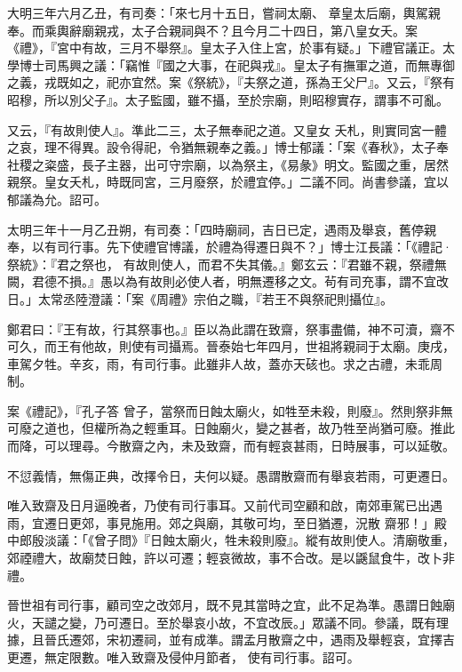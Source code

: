 \begin{pinyinscope}
 大明三年六月乙丑，有司奏：「來七月十五日，嘗祠太廟、
 章皇太后廟，輿駕親奉。而乘輿辭廟親戎，太子合親祠與不？且今月二十四日，第八皇女夭。案《禮》，『宮中有故，三月不舉祭』。皇太子入住上宮，於事有疑。」下禮官議正。太學博士司馬興之議：「竊惟『國之大事，在祀與戎』。皇太子有撫軍之道，而無專御之義，戎既如之，祀亦宜然。案《祭統》，『夫祭之道，孫為王父尸』。又云，『祭有昭穆，所以別父子』。太子監國，雖不攝，至於宗廟，則昭穆實存，謂事不可亂。



 又云，『有故則使人』。準此二三，太子無奉祀之道。又皇女
 夭札，則實同宮一體之哀，理不得異。設令得祀，令猶無親奉之義。」博士郁議：「案《春秋》，太子奉社稷之粢盛，長子主器，出可守宗廟，以為祭主，《易彖》明文。監國之重，居然親祭。皇女夭札，時既同宮，三月廢祭，於禮宜停。」二議不同。尚書參議，宜以郁議為允。詔可。



 太明三年十一月乙丑朔，有司奏：「四時廟祠，吉日已定，遇雨及舉哀，舊停親奉，以有司行事。先下使禮官博議，於禮為得遷日與不？」博士江長議：「《禮記·祭統》：『君之祭也，
 有故則使人，而君不失其儀。』鄭玄云：『君雖不親，祭禮無闕，君德不損。』愚以為有故則必使人者，明無遷移之文。茍有司充事，謂不宜改日。」太常丞陸澄議：「案《周禮》宗伯之職，『若王不與祭祀則攝位』。



 鄭君曰：『王有故，行其祭事也。』臣以為此謂在致齋，祭事盡備，神不可瀆，齋不可久，而王有他故，則使有司攝焉。晉泰始七年四月，世祖將親祠于太廟。庚戌，車駕夕牲。辛亥，雨，有司行事。此雖非人故，蓋亦天硋也。求之古禮，未乖周制。



 案《禮記》，『孔子答
 曾子，當祭而日蝕太廟火，如牲至未殺，則廢』。然則祭非無可廢之道也，但權所為之輕重耳。日蝕廟火，變之甚者，故乃牲至尚猶可廢。推此而降，可以理尋。今散齋之內，未及致齋，而有輕哀甚雨，日時展事，可以延敬。



 不愆義情，無傷正典，改擇令日，夫何以疑。愚謂散齋而有舉哀若雨，可更遷日。



 唯入致齋及日月逼晚者，乃使有司行事耳。又前代司空顧和啟，南郊車駕已出遇雨，宜遷日更郊，事見施用。郊之與廟，其敬可均，至日猶遷，況散
 齋邪！」殿中郎殷淡議：「《曾子問》『日蝕太廟火，牲未殺則廢』。縱有故則使人。清廟敬重，郊禋禮大，故廟焚日蝕，許以可遷；輕哀微故，事不合改。是以鼷鼠食牛，改卜非禮。



 晉世祖有司行事，顧司空之改郊月，既不見其當時之宜，此不足為準。愚謂日蝕廟火，天譴之變，乃可遷日。至於舉哀小故，不宜改辰。」眾議不同。參議，既有理據，且晉氏遷郊，宋初遷祠，並有成準。謂孟月散齋之中，遇雨及舉輕哀，宜擇吉更遷，無定限數。唯入致齋及侵仲月節者，
 使有司行事。詔可。




\end{pinyinscope}
